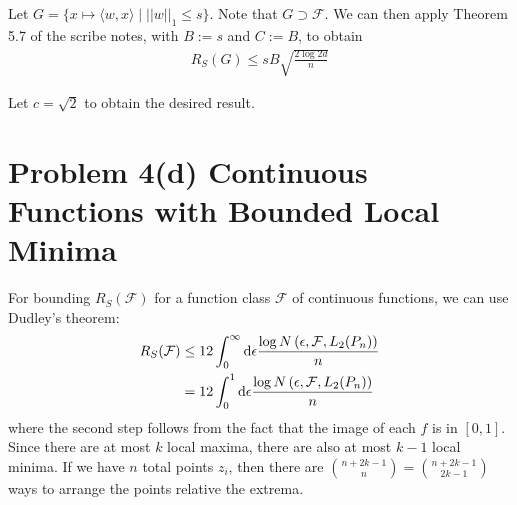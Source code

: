 \documentclass[11pt]{article}
\newcommand{\1}{\mathbb{I}} %
\begin{document}
Let $G = \{ x \mapsto \langle w, x \rangle \mid ||w||_1 \leq s \}$. Note that $G \supset \mathcal F$. We can then apply Theorem 5.7 of the scribe notes, with $B := s$ and $C := B$, to obtain 
\begin{align}
	R_S(G) \leq s B \sqrt{\frac{2\log 2d}{n}}
\end{align}

Let $c = \sqrt{2}$ to obtain the desired result.







\clearpage 
\section*{Problem 4(d) Continuous Functions with Bounded Local Minima}

For bounding $R_S(\mathcal F)$ for a function class $\mathcal F$ of continuous functions, we can use Dudley's theorem:
\begin{align}
	R_S(\mathcal F) 	
		&\leq 12 \int_0^{\infty} \mathrm{d}\epsilon \dfrac{  \log N\left(  \epsilon, \mathcal F, L_2(P_n)  \right)  }{ n  } \\
		&= 12 \int_0^{1} \mathrm{d}\epsilon \dfrac{  \log N\left(  \epsilon, \mathcal F, L_2(P_n)  \right)  }{ n  } 
\end{align}
where the second step follows from the fact that the image of each $f$ is in $[0, 1]$. Since there are at most $k$ local maxima, there are also at most $k-1$ local minima. If we have $n$ total points $z_i$, then there are ${n + 2k - 1 \choose n} = {n + 2k - 1 \choose 2k - 1}$ ways to arrange the points relative the extrema. 
\end{document}
